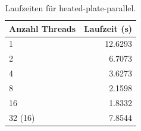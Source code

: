 \begin{table}[htbp]
 \centering 
 \caption{Laufzeiten für heated-plate-parallel.}
 \begin{tabular}{|l|r|}
  \textbf{Anzahl Threads} & \textbf{Laufzeit (s)} \\ \hline 
  1 & 12.6293 \\
  2 & 6.7073 \\
  4 & 3.6273 \\
  8 & 2.1598 \\
  16 & 1.8332 \\
  32 (16) & 7.8544
 \end{tabular}
\label{tab:aufgabe5}
\end{table}
